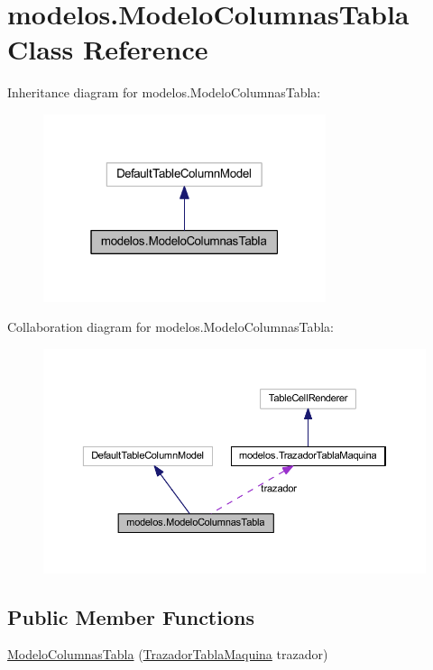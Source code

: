 \hypertarget{classmodelos_1_1_modelo_columnas_tabla}{}\section{modelos.\+Modelo\+Columnas\+Tabla Class Reference}
\label{classmodelos_1_1_modelo_columnas_tabla}


Inheritance diagram for modelos.\+Modelo\+Columnas\+Tabla\+:\nopagebreak
\begin{figure}[H]
\begin{center}
\leavevmode
\includegraphics[width=235pt]{classmodelos_1_1_modelo_columnas_tabla__inherit__graph}
\end{center}
\end{figure}


Collaboration diagram for modelos.\+Modelo\+Columnas\+Tabla\+:\nopagebreak
\begin{figure}[H]
\begin{center}
\leavevmode
\includegraphics[width=350pt]{classmodelos_1_1_modelo_columnas_tabla__coll__graph}
\end{center}
\end{figure}
\subsection*{Public Member Functions}
\begin{DoxyCompactItemize}
\item 
\mbox{\hyperlink{classmodelos_1_1_modelo_columnas_tabla_a1ac636f1d60b6abb63e86834e6c8f09d}{Modelo\+Columnas\+Tabla}} (\mbox{\hyperlink{classmodelos_1_1_trazador_tabla_maquina}{Trazador\+Tabla\+Maquina}} trazador)
\end{DoxyCompactItemize}


